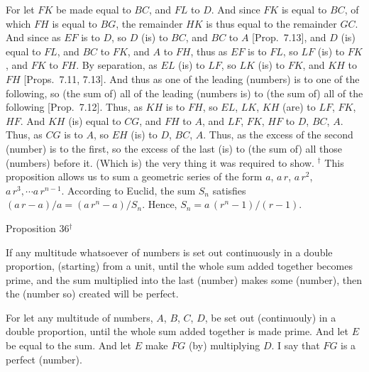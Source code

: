 For let $FK$ be made equal to $BC$, and $FL$ to  $D$. And since $FK$
is equal to $BC$, of which $FH$ is equal to $BG$, the remainder
$HK$ is thus equal to the remainder $GC$. And since as $EF$ is to $D$, so
$D$ (is) to $BC$, and $BC$ to $A$ [Prop.~7.13],
and $D$ (is) equal to $FL$, and $BC$ to $FK$, and $A$ to  $FH$, thus
as $EF$ is to $FL$, so $LF$ (is) to $FK$, and $FK$ to $FH$. By
separation, as $EL$ (is) to $LF$, so $LK$ (is) to $FK$, and $KH$ to $FH$
[Props.~7.11, 7.13]. And thus
as one of the leading (numbers) is to one of the following, so (the sum of) all of the leading (numbers is) to (the sum of) all of the following [Prop.~7.12]. Thus, as $KH$ is to $FH$, so
$EL$, $LK$, $KH$ (are) to $LF$, $FK$, $HF$.  And $KH$ (is) equal to
$CG$, and $FH$ to $A$, and $LF$, $FK$, $HF$ to $D$, $BC$, $A$.
Thus, as $CG$ is to $A$, so $EH$ (is) to $D$, $BC$, $A$. Thus,
as the excess of the second (number) is to the first, so the excess of the last
(is) to (the sum of) all  those (numbers) before it. (Which is) the very thing it was required to show.
{\footnotesize\noindent$^\dag$ This proposition allows us to sum a geometric series of the form $a$, $a\,r$, $a\,r^2$, $a\,r^3,\cdots a\,r^{n-1}$. 
According to Euclid, the sum $S_n$  satisfies
$(a\,r-a)/a = (a\,r^n-a)/S_n$. Hence, $S_n= a\,(r^n-1)/(r-1)$.}


\begin{center}
{\large Proposition 36}$^\dag$
\end{center}

If any multitude whatsoever of numbers is set out
continuously 
in a double  proportion, (starting) from a  unit,
until the whole sum added together becomes  prime, and the sum multiplied
into the last (number) makes some (number), then the (number so) created
will be perfect.

For let any multitude of numbers, $A$, $B$, $C$, $D$, be set out (continuouly) in a
double proportion, until the whole sum added together is made  prime. And let $E$ be equal to the sum. And let $E$ make $FG$ (by) multiplying $D$. I say that $FG$ is a perfect (number).

\epsfysize=1.3in
\centerline{}
~\\


\epsfysize=1.4in
\centerline{}

